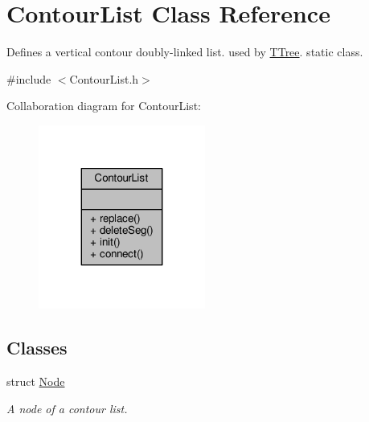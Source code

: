\hypertarget{classContourList}{}\section{Contour\+List Class Reference}
\label{classContourList}


Defines a vertical contour doubly-\/linked list. used by \hyperlink{classTTree}{T\+Tree}. static class.  




{\ttfamily \#include $<$Contour\+List.\+h$>$}



Collaboration diagram for Contour\+List\+:
\nopagebreak
\begin{figure}[H]
\begin{center}
\leavevmode
\includegraphics[width=155pt]{classContourList__coll__graph}
\end{center}
\end{figure}
\subsection*{Classes}
\begin{DoxyCompactItemize}
\item 
struct \hyperlink{structContourList_1_1Node}{Node}
\begin{DoxyCompactList}\small\item\em A node of a contour list. \end{DoxyCompactList}\end{DoxyCompactItemize}
